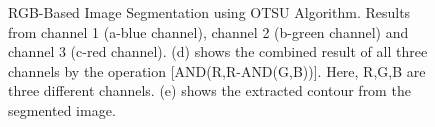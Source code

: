 \documentclass{article}
\begin{document}
\begin{figure}[!htbp]
     \centering
    \captionsetup[subfigure]{labelformat=empty}
    \caption{RGB-Based Image Segmentation using OTSU Algorithm. Results from channel 1 (a-blue channel), channel 2 (b-green channel) and channel 3 (c-red channel). (d) shows the combined result of all three channels by the operation [AND(R,R-AND(G,B))]. Here, R,G,B are three different channels. (e) shows the extracted contour from the segmented image.}
    \label{fig:cat_2}
\end{figure}
\end{document}
